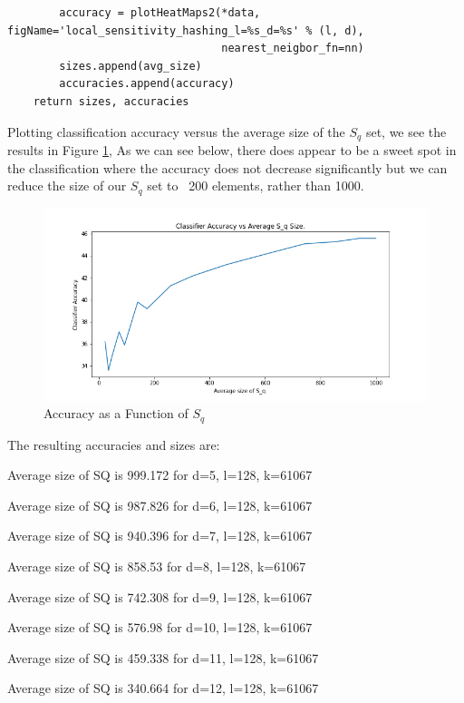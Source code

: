 \documentclass[12pt]{article}
\begin{document}
\begin{enumerate}[label=(\alph*)]
\begin{verbatim}
        accuracy = plotHeatMaps2(*data, figName='local_sensitivity_hashing_l=%s_d=%s' % (l, d),
                                 nearest_neigbor_fn=nn)
        sizes.append(avg_size)
        accuracies.append(accuracy)
    return sizes, accuracies

\end{verbatim}

    Plotting classification accuracy versus the average size of the $S_q$ set, we see the results in Figure \ref{fig:accuracy_as_sq}, As we can see below, there does appear to be a sweet spot in the classification where the accuracy does not decrease significantly but we can reduce the size of our $S_q$ set to ~200 elements, rather than 1000.

    \begin{figure}[!ht]
      \centering
      \includegraphics[scale=0.5]{figures/Classifier_vs_s_q_size.png}
      \caption{Accuracy as a Function of $S_q$}
      \label{fig:accuracy_as_sq}
    \end{figure}

    The resulting accuracies and sizes are:

    Average size of SQ is 999.172 for d=5, l=128, k=61067

    Average size of SQ is 987.826 for d=6, l=128, k=61067

    Average size of SQ is 940.396 for d=7, l=128, k=61067

    Average size of SQ is 858.53 for d=8, l=128, k=61067

    Average size of SQ is 742.308 for d=9, l=128, k=61067

    Average size of SQ is 576.98 for d=10, l=128, k=61067

    Average size of SQ is 459.338 for d=11, l=128, k=61067

    Average size of SQ is 340.664 for d=12, l=128, k=61067


\end{enumerate}
\end{document}
